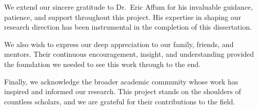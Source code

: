 
\begin{acknowledgements}
	\addchaptertocentry{\acknowledgementname}
	\vspace{0.5cm}
	We extend our sincere gratitude to Dr.\ Eric Affum for his invaluable guidance, patience, and support throughout this project. His expertise in shaping our research direction has been instrumental in the completion of this dissertation.

	We also wish to express our deep appreciation to our family, friends, and mentors. Their continuous encouragement, insight, and understanding provided the foundation we needed to see this work through to the end.

	Finally, we acknowledge the broader academic community whose work has inspired and informed our research. This project stands on the shoulders of countless scholars, and we are grateful for their contributions to the field.
\end{acknowledgements}
\pagebreak
